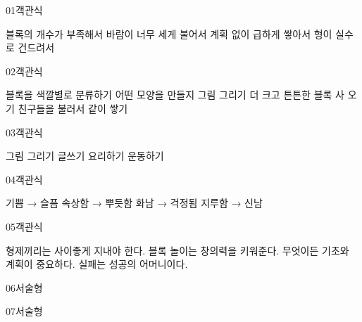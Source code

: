 \documentclass[fs11,seriesFre]{korfarm-base}
\begin{document}
\kfActivityBg \par{}\par\nopagebreak[4]\smallskip\nopagebreak[4]


\begin{kfQBlock}{01}{객관식}
\begin{kfChoices}
\kfChoice 블록의 개수가 부족해서
\kfChoice 바람이 너무 세게 불어서
\kfChoice 계획 없이 급하게 쌓아서
\kfChoice 형이 실수로 건드려서
\end{kfChoices}
\end{kfQBlock}
\begin{kfQBlock}{02}{객관식}
\begin{kfChoices}
\kfChoice 블록을 색깔별로 분류하기
\kfChoice 어떤 모양을 만들지 그림 그리기
\kfChoice 더 크고 튼튼한 블록 사 오기
\kfChoice 친구들을 불러서 같이 쌓기
\end{kfChoices}
\end{kfQBlock}
\begin{kfQBlock}{03}{객관식}
\begin{kfChoices}
\kfChoice 그림 그리기
\kfChoice 글쓰기
\kfChoice 요리하기
\kfChoice 운동하기
\end{kfChoices}
\end{kfQBlock}
\begin{kfQBlock}{04}{객관식}
\begin{kfChoices}
\kfChoice 기쁨 → 슬픔
\kfChoice 속상함 → 뿌듯함
\kfChoice 화남 → 걱정됨
\kfChoice 지루함 → 신남
\end{kfChoices}
\end{kfQBlock}
\begin{kfQBlock}{05}{객관식}
\begin{kfChoices}
\kfChoice 형제끼리는 사이좋게 지내야 한다.
\kfChoice 블록 놀이는 창의력을 키워준다.
\kfChoice 무엇이든 기초와 계획이 중요하다.
\kfChoice 실패는 성공의 어머니이다.
\end{kfChoices}
\end{kfQBlock}
\begin{kfQBlock}{06}{서술형}
\end{kfQBlock}
\begin{kfQBlock}{07}{서술형}
\end{kfQBlock}
\end{document}

